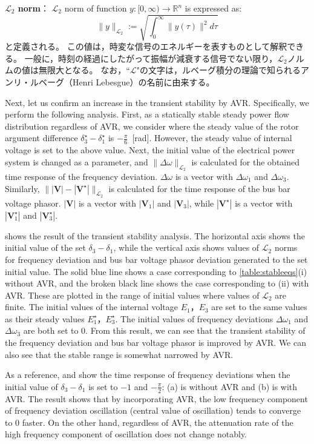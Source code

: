 \documentclass[tombow,dvipdfmx]{corona-a5-1.1}
\begin{document}
\begin{例}[自動電圧調整器による定態安定性と過渡安定度の変化]
\begin{COLUMN}
\noindent \textbf{$\mathcal{L}_2$ norm}：
$\mathcal{L}_2$ norm of function $y:[0,\infty) \rightarrow \mathbb{R}^n$ is
expressed as:
\[
\|y\|_{\mathcal{L}_2} := \sqrt{
\int^{\infty}_{0}
\| y(\tau)\|^2  d \tau
}
\]
と定義される。
この値は，時変な信号のエネルギーを表すものとして解釈できる。
一般に，時刻の経過にしたがって振幅が減衰する信号でない限り，$\mathcal{L}_2$ノルムの値は無限大となる。
なお，``$\mathcal{L}$"の文字は，ルベーグ積分の理論で知られるアンリ・ルベーグ（Henri Lebesgue）の名前に由来する。
\end{COLUMN}

Next, let us confirm an increase in the transient stability by AVR.
Specifically, we perform the following analysis.
First, as a statically stable steady power flow distribution regardless of AVR, we consider where the steady value of the rotor argument difference $\delta_3^{\star}-\delta_1^{\star}$ is $-\tfrac{\pi}{6}$~[rad].
However, the steady value of internal voltage is set to the above value.
Next, the initial value of the electrical power system is changed as a parameter, and $\|\Delta\omega\|_{\mathcal{L}_2}$ is calculated for the obtained time response of the frequency deviation.
$\Delta \omega$ is a vector with $\Delta \omega_1$ and $\Delta \omega_3$.
Similarly, $\||\bm{V}|-|\bm{V}^{\star}| \|_{\mathcal{L}_2}$ is calculated for the time response of the bus bar voltage phasor.
$|\bm{V}|$ is a vector with $|\bm{V}_1|$ and $|\bm{V}_3|$, while $|\bm{V}^{\star}|$ is a vector with $|\bm{V}_1^{\star}|$ and $|\bm{V}_3^{\star}|$.


 shows the result of the transient stability analysis.
The horizontal axis shows the initial value of the set $\delta_3-\delta_1$, while the vertical axis shows values of $\mathcal{L}_2$ norms for frequency deviation and bus bar voltage phasor deviation generated to the set initial value.
The solid blue line shows a case corresponding to \ref{table:stableeqs}(i) without AVR, and the broken black line shows the case corresponding to (ii) with AVR.
These are plotted in the range of initial values where values of $\mathcal{L}_2$ are finite.
The initial values of the internal voltage $E_1$，$E_3$ are set to the same values as their steady values $E_1^{\star}$，$E_3^{\star}$.
The initial values of frequency deviations $\Delta \omega_1$ and $\Delta \omega_3$ are both set to 0.
From this result, we can see that the transient stability of the frequency deviation and bus bar voltage phasor is improved by AVR.
We can also see that the stable range is somewhat narrowed by AVR.

As a reference,  and  show the time response of frequency deviations when the initial value of $\delta_3-\delta_1$ is set to $-1$ and $-\tfrac{\pi}{2}$: (a) is without AVR and (b) is with AVR.
The result shows that by incorporating AVR, the low frequency component of frequency deviation oscillation (central value of oscillation) tends to converge to 0 faster.
On the other hand, regardless of AVR, the attenuation rate of the high frequency component of oscillation does not change notably.
\end{例}
\end{document}
